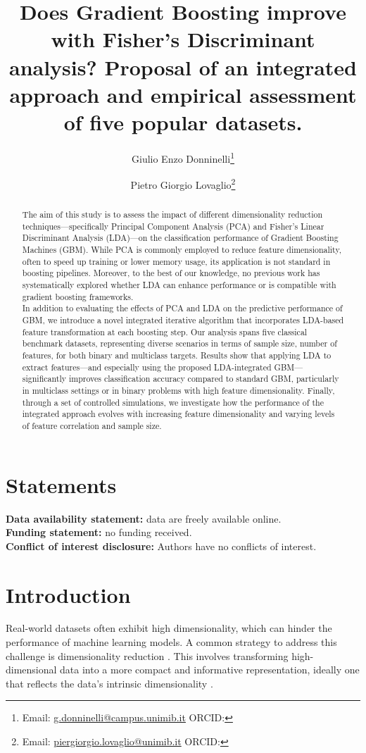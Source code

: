 \documentclass[11pt,a4paper]{article}
\title{Does Gradient Boosting improve with Fisher’s Discriminant analysis? Proposal of an integrated approach and empirical assessment of five popular datasets.}
\author[1]{Giulio Enzo Donninelli\thanks{Email: \href{mailto:g.donninelli@campus.unimib.it}{g.donninelli@campus.unimib.it} \quad ORCID: \orcidlink{0009-0009-7332-1159}}}
\author[1,2]{Pietro Giorgio Lovaglio\thanks{Email: \href{mailto:piergiorgio.lovaglio@unimib.it}{piergiorgio.lovaglio@unimib.it} \quad ORCID: \orcidlink{0000-0002-2340-0547}}}
\affil[1]{Dept of Statistics and Quantitative Methods, University of Milano-Bicocca, Milan, Italy}
\affil[2]{CRISP Research Center, University of Milano-Bicocca, Milan, Italy}
\date{} %
\begin{document}
\maketitle

\begin{abstract}
The aim of this study is to assess the impact of different dimensionality reduction techniques—specifically Principal Component Analysis (PCA) and Fisher's Linear Discriminant Analysis (LDA)—on the classification performance of Gradient Boosting Machines (GBM). While PCA is commonly employed to reduce feature dimensionality, often to speed up training or lower memory usage, its application is not standard in boosting pipelines. Moreover, to the best of our knowledge, no previous work has systematically explored whether LDA can enhance performance or is compatible with gradient boosting frameworks.\\[2ex]

In addition to evaluating the effects of PCA and LDA on the predictive performance of GBM, we introduce a novel integrated iterative algorithm that incorporates LDA-based feature transformation at each boosting step. Our analysis spans five classical benchmark datasets, representing diverse scenarios in terms of sample size, number of features, for both binary and multiclass targets. Results show that applying LDA to extract features—and especially using the proposed LDA-integrated GBM—significantly improves classification accuracy compared to standard GBM, particularly in multiclass settings or in binary problems with high feature dimensionality. Finally, through a set of controlled simulations, we investigate how the performance of the integrated approach evolves with increasing feature dimensionality and varying levels of feature correlation and sample size.

\end{abstract}

\section*{Statements}
\noindent\textbf{Data availability statement:} data are freely available online.\\
\textbf{Funding statement:} no funding received.\\
\textbf{Conflict of interest disclosure:} Authors have no conflicts of interest.

\newpage
\section{Introduction}
Real-world datasets often exhibit high dimensionality, which can hinder the performance of machine learning models. A common strategy to address this challenge is dimensionality reduction \citep{van2009dimensionality}. This involves transforming high-dimensional data into a more compact and informative representation, ideally one that reflects the data's intrinsic dimensionality \citep{huang2019review, bacanin2021dimensionality}.
\end{document}
